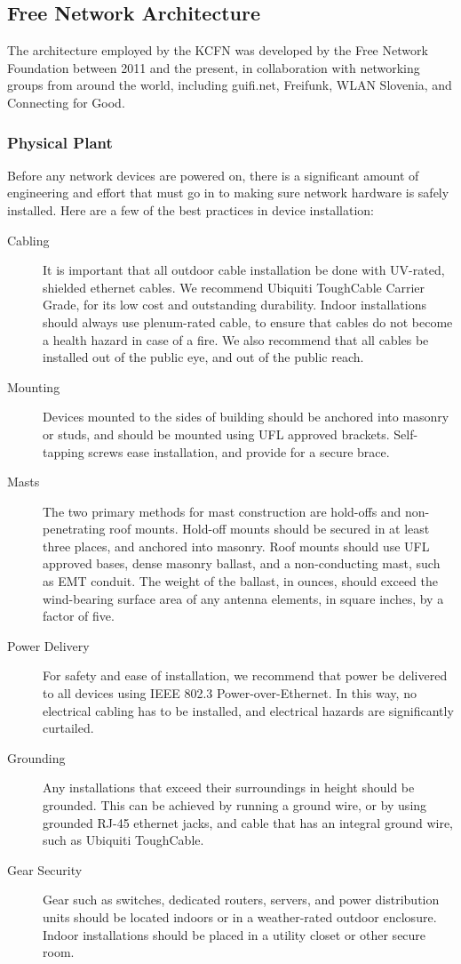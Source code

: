 \subsection{Free Network Architecture}
The architecture employed by the KCFN was developed by the Free Network
Foundation between 2011 and the present, in collaboration with networking groups from around the
world, including guifi.net, Freifunk, WLAN Slovenia, and Connecting for Good.\par

\subsubsection{Physical Plant}
Before any network devices are powered on,
there is a significant amount of engineering and effort that must go in to making
sure network hardware is safely installed. Here are a few of the best practices in device
installation:
\begin{description}
\item[Cabling] It is important that all outdoor cable installation be done with
UV-rated, shielded ethernet cables. We recommend Ubiquiti ToughCable Carrier
Grade, for its low cost and outstanding durability. Indoor installations should
always use plenum-rated cable, to ensure that cables do not become a health
hazard in case of a fire. We also recommend that all cables be installed out of
the public eye, and out of the public reach. 
\item[Mounting] Devices mounted to the sides of building should be anchored into
masonry or studs, and should be mounted using UFL approved brackets.
Self-tapping screws ease installation, and provide for a secure brace.
\item[Masts] The two primary methods for mast construction are 
hold-offs and non-penetrating roof mounts. Hold-off mounts should be secured in
at least three places, and anchored into masonry. Roof mounts should use UFL
approved bases, dense masonry ballast, and a non-conducting mast, such as EMT
conduit. The weight of the ballast, in ounces, should exceed the wind-bearing
surface area of any antenna elements, in square inches, by a factor of five.
\item[Power Delivery] For safety and ease of installation, we recommend that
power be delivered to all devices using IEEE 802.3 Power-over-Ethernet. In this
way, no electrical cabling has to be installed, and electrical hazards are
significantly curtailed.
\item[Grounding] Any installations that exceed their
surroundings in height should be grounded. This can be achieved by running a
ground wire, or by using grounded RJ-45 ethernet jacks, and cable that has an
integral ground wire, such as Ubiquiti ToughCable.
\item[Gear Security] Gear  such as switches, dedicated
routers, servers, and power distribution units should be located indoors or in a
weather-rated outdoor enclosure. Indoor installations should be placed in a utility
closet or other secure room. 
\end{description}


